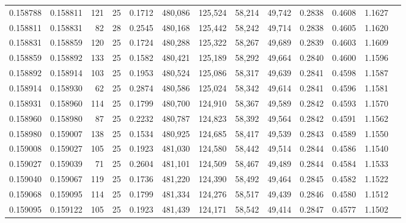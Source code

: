 \begin{tabular}{rrrrrrrrrrrrr}
0.158788 & 0.158811 &   121 &  25 &                                     0.1712 & 480,086 & 125,524 &  58,214 &  49,742 & 0.2838 & 0.4608 & 1.1627 \\
0.158811 & 0.158831 &    82 &  28 &                                     0.2545 & 480,168 & 125,442 &  58,242 &  49,714 & 0.2838 & 0.4605 & 1.1620 \\
0.158831 & 0.158859 &   120 &  25 &                                     0.1724 & 480,288 & 125,322 &  58,267 &  49,689 & 0.2839 & 0.4603 & 1.1609 \\
0.158859 & 0.158892 &   133 &  25 &                                     0.1582 & 480,421 & 125,189 &  58,292 &  49,664 & 0.2840 & 0.4600 & 1.1596 \\
0.158892 & 0.158914 &   103 &  25 &                                     0.1953 & 480,524 & 125,086 &  58,317 &  49,639 & 0.2841 & 0.4598 & 1.1587 \\
0.158914 & 0.158930 &    62 &  25 &                                     0.2874 & 480,586 & 125,024 &  58,342 &  49,614 & 0.2841 & 0.4596 & 1.1581 \\
0.158931 & 0.158960 &   114 &  25 &                                     0.1799 & 480,700 & 124,910 &  58,367 &  49,589 & 0.2842 & 0.4593 & 1.1570 \\
0.158960 & 0.158980 &    87 &  25 &                                     0.2232 & 480,787 & 124,823 &  58,392 &  49,564 & 0.2842 & 0.4591 & 1.1562 \\
0.158980 & 0.159007 &   138 &  25 &                                     0.1534 & 480,925 & 124,685 &  58,417 &  49,539 & 0.2843 & 0.4589 & 1.1550 \\
0.159008 & 0.159027 &   105 &  25 &                                     0.1923 & 481,030 & 124,580 &  58,442 &  49,514 & 0.2844 & 0.4586 & 1.1540 \\
0.159027 & 0.159039 &    71 &  25 &                                     0.2604 & 481,101 & 124,509 &  58,467 &  49,489 & 0.2844 & 0.4584 & 1.1533 \\
0.159040 & 0.159067 &   119 &  25 &                                     0.1736 & 481,220 & 124,390 &  58,492 &  49,464 & 0.2845 & 0.4582 & 1.1522 \\
0.159068 & 0.159095 &   114 &  25 &                                     0.1799 & 481,334 & 124,276 &  58,517 &  49,439 & 0.2846 & 0.4580 & 1.1512 \\
0.159095 & 0.159122 &   105 &  25 &                                     0.1923 & 481,439 & 124,171 &  58,542 &  49,414 & 0.2847 & 0.4577 & 1.1502 \\

\end{tabular}
